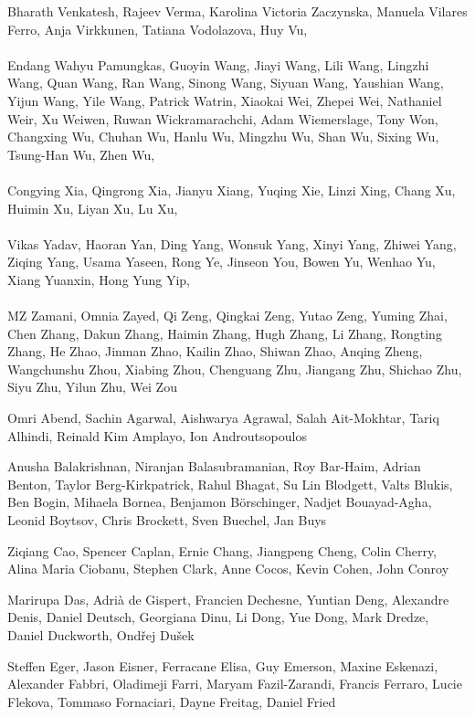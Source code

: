 \documentclass[11pt]{article}
\newcommand{\aclitem}[1][]{\item[#1:\vspace{2mm}]}
\begin{document}
\begin{description}[itemsep=4mm, style=nextline]
Bharath Venkatesh, 
Rajeev Verma, 
Karolina Victoria Zaczynska, 
Manuela Vilares Ferro, 
Anja Virkkunen, 
Tatiana Vodolazova, 
Huy Vu, 
\\
\\
Endang Wahyu Pamungkas, 
Guoyin Wang, 
Jiayi Wang, 
Lili Wang, 
Lingzhi Wang, 
Quan Wang, 
Ran Wang, 
Sinong Wang, 
Siyuan Wang, 
Yaushian Wang, 
Yijun Wang, 
Yile Wang, 
Patrick Watrin, 
Xiaokai Wei, 
Zhepei Wei, 
Nathaniel Weir, 
Xu Weiwen, 
Ruwan Wickramarachchi, 
Adam Wiemerslage, 
Tony Won, 
Changxing Wu, 
Chuhan Wu, 
Hanlu Wu, 
Mingzhu Wu, 
Shan Wu, 
Sixing Wu, 
Tsung-Han Wu, 
Zhen Wu, 
\\
\\
Congying Xia, 
Qingrong Xia, 
Jianyu Xiang, 
Yuqing Xie, 
Linzi Xing, 
Chang Xu, 
Huimin Xu, 
Liyan Xu, 
Lu Xu, 
\\
\\
Vikas Yadav, 
Haoran Yan, 
Ding Yang, 
Wonsuk Yang, 
Xinyi Yang, 
Zhiwei Yang, 
Ziqing Yang, 
Usama Yaseen, 
Rong Ye, 
Jinseon You, 
Bowen Yu, 
Wenhao Yu, 
Xiang Yuanxin, 
Hong Yung Yip,
\\
\\
MZ Zamani, 
Omnia Zayed, 
Qi Zeng, 
Qingkai Zeng, 
Yutao Zeng, 
Yuming Zhai, 
Chen Zhang, 
Dakun Zhang, 
Haimin Zhang, 
Hugh Zhang, 
Li Zhang, 
Rongting Zhang, 
He Zhao, 
Jinman Zhao, 
Kailin Zhao, 
Shiwan Zhao, 
Anqing Zheng, 
Wangchunshu Zhou, 
Xiabing Zhou, 
Chenguang Zhu, 
Jiangang Zhu, 
Shichao Zhu, 
Siyu Zhu, 
Yilun Zhu, 
Wei Zou

\aclitem[We would like to recognize the following Outstanding Reviewers]

Omri Abend, 
Sachin Agarwal, 
Aishwarya  Agrawal, 
Salah Ait-Mokhtar, 
Tariq Alhindi, 
Reinald Kim Amplayo, 
Ion Androutsopoulos

Anusha Balakrishnan, 
Niranjan Balasubramanian, 
Roy  Bar-Haim, 
Adrian Benton, 
Taylor Berg-Kirkpatrick, 
Rahul Bhagat, 
Su Lin Blodgett, 
Valts Blukis, 
Ben Bogin, 
Mihaela Bornea, 
Benjamon Börschinger, 
Nadjet Bouayad-Agha, 
Leonid Boytsov, 
Chris Brockett, 
Sven  Buechel, 
Jan Buys

Ziqiang Cao, 
Spencer Caplan, 
Ernie Chang, 
Jiangpeng Cheng, 
Colin Cherry, 
Alina Maria Ciobanu, 
Stephen Clark, 
Anne Cocos, 
Kevin Cohen, 
John Conroy

Marirupa Das, 
Adrià de Gispert, 
Francien Dechesne, 
Yuntian Deng, 
Alexandre Denis, 
Daniel Deutsch, 
Georgiana Dinu, 
Li Dong, 
Yue Dong, 
Mark Dredze, 
Daniel Duckworth, 
Ondřej Dušek

Steffen  Eger, 
Jason Eisner, 
Ferracane Elisa, 
Guy Emerson, 
Maxine Eskenazi, 
Alexander Fabbri, 
Oladimeji Farri, 
Maryam Fazil-Zarandi, 
Francis Ferraro, 
Lucie Flekova, 
Tommaso Fornaciari, 
Dayne Freitag, 
Daniel Fried


\end{description}
\end{document}

